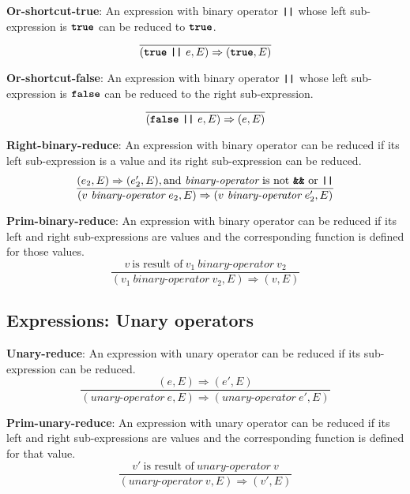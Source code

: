 \vspace{10mm}
\textbf{Or-shortcut-true}: An expression with binary operator
$\textbf{\texttt{||}}$ whose left sub-expression is
$\textbf{\texttt{true}}$ can be reduced to
$\textbf{\texttt{true}}$.
\[
\frac{
}{
  (\textbf{\texttt{true}}\  \textbf{\texttt{||}}\ e, E)
  \Rightarrow
  (\textbf{\texttt{true}}, E)
}
\]

\vspace{10mm}
\textbf{Or-shortcut-false}: An expression with binary operator
$\textbf{\texttt{||}}$ whose left sub-expression is
$\textbf{\texttt{false}}$ can be reduced to
the right sub-expression.
\[
\frac{
}{
  (\textbf{\texttt{false}}\  \textbf{\texttt{||}}\ e, E)
  \Rightarrow
  (e, E)
}
\]


\vspace{10mm}
\textbf{Right-binary-reduce}: An expression with binary operator
can be reduced if its left sub-expression is a value and its right
sub-expression can be reduced.
\[
\frac{
  ( e_2 , E ) \Rightarrow (e_2', E), \textrm{and}\ \textit{binary-operator}
  \ \mbox{is not}\ \textbf{\texttt{\&\&}}\ \textrm{or}\ \texttt{\textbf{||}}
}{
  (v\  \textit{binary-operator} \ e_2, E)
  \Rightarrow
  (v\  \textit{binary-operator} \ e_2', E)
}
\]

\vspace{10mm}
\textbf{Prim-binary-reduce}: An expression with binary operator
can be reduced if its left and right sub-expressions are values and
the corresponding function is defined for those values.
\[
\frac{
  v\ \mbox{is result of}\ v_1\  \textit{binary-operator} \ v_2
}{
  (v_1\  \textit{binary-operator} \ v_2, E)
  \Rightarrow
  (v, E)
}
\]

\subsection*{Expressions: Unary operators}

\textbf{Unary-reduce}: An expression with unary operator
can be reduced if its sub-expression can be reduced.
\[
\frac{
  ( e , E ) \Rightarrow (e', E)
}{
  (\textit{unary-operator} \ e, E)
  \Rightarrow
  (\textit{unary-operator} \ e', E)
}
\]

\vspace{10mm}
\textbf{Prim-unary-reduce}: An expression with unary operator
can be reduced if its left and right sub-expressions are values and
the corresponding function is defined for that value.
\[
\frac{
  v'\ \mbox{is result of}\ \textit{unary-operator} \ v
}{
  (\textit{unary-operator} \ v, E)
  \Rightarrow
  (v', E)
}
\]

